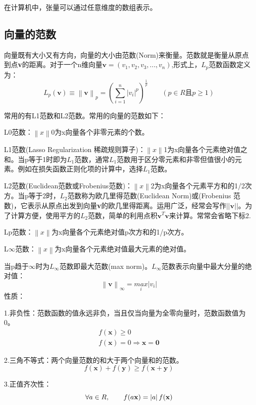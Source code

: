 \documentclass[openbib]{article}
\begin{document}
在计算机中，张量可以通过任意维度的数组表示。

\subsection{向量的范数}
向量既有大小又有方向，向量的大小由范数(Norm)来衡量。范数就是衡量从原点到点\textbf{v}的距离。对于一个n维向量$\textbf{v}=(v_1,v_2,v_3,...,v_n)$,形式上，$L_p$范数函数定义为：
$$L_p(\textbf{v})\equiv\left\| \textbf{v} \right\|_p = (\sum_{i=1}^{n}|v_i|^p)^{\frac{1}{p}} \qquad (p\in R \text{且} p\ge1)$$

常用的有L1范数和L2范数。常用的向量的范数如下：

L0范数：$\left\| x \right\|$0为x向量各个非零元素的个数。

L1范数(Lasso Regularization 稀疏规则算子)：$\left\| x \right\|$1为x向量各个元素绝对值之和。当p等于1时即为$L_1$范数，通常$L_1$范数用于区分零元素和非零但值很小的元素。例如在损失函数正则化项的计算中，选择$L_1$范数。

L2范数(Euclidean范数或Frobenius范数)：$\left\| x \right\|$2为x向量各个元素平方和的1/2次方。当p等于2时，$L_2$范数称为欧几里得范数(Euclidean Norm)或(Frobenius 范数)，它表示从原点出发到向量\textbf{v}的欧几里得距离。运用广泛，经常会写作$||\textbf{v}||$。为了计算方便，使用平方的$L_2$范数，简单的利用点积$\textbf{v}^T\textbf{v}$来计算。常常会省略下标2.

Lp范数：$\left\| x \right\|$为x向量各个元素绝对值p次方和的1/p次方。

L$\infty$范数：$\left\| x \right\|$为x向量各个元素绝对值最大元素的绝对值。

当p趋于$\infty$时为$L_{\infty}$范数即最大范数(max norm)。$L_{\infty}$范数表示向量中最大分量的绝对值：
$$\left\|\textbf{v}\right\|_{\infty} = \underset{i}{max}|v_i|$$
性质：

1.非负性：范数函数的值永远非负，当且仅当向量为全零向量时，范数函数值为0。
\begin{equation*}
	\begin{aligned}
f(\textbf{x})\ge0	\\
f(\textbf{x})=0\Rightarrow \textbf{x}=\textbf{0}
	\end{aligned}
\end{equation*}

2.三角不等式：两个向量范数的和大于两个向量和的范数。
$$f(\textbf{x})+f(\textbf{y})\ge f(\textbf{x}+\textbf{y})$$

3.正值齐次性：
$$\forall a\in R, \qquad f(a\textbf x) = \left| a \right|f(\textbf x)$$
\end{document}
